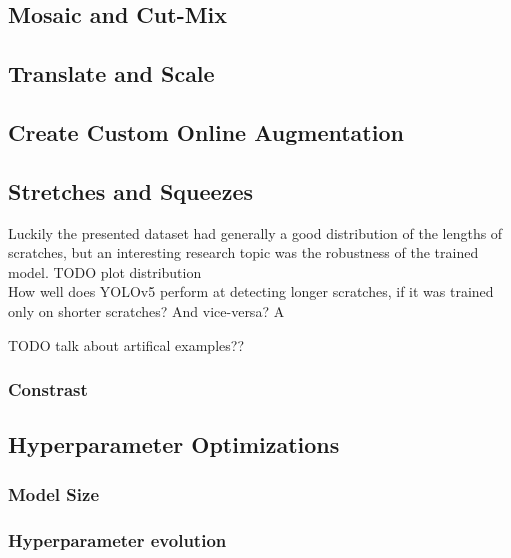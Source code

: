 \subsection{Mosaic and Cut-Mix}


\subsection{Translate and Scale}

\subsection{Create Custom Online Augmentation}

\subsection{Stretches and Squeezes}
Luckily the presented dataset had generally a good distribution of the lengths of scratches, but an interesting research topic was the robustness of the trained model.
TODO plot distribution \\

 How well does YOLOv5 perform at detecting longer scratches, if it was trained only on shorter scratches? And vice-versa? A


TODO talk about artifical examples?? \\

\subsubsection{Constrast}



\subsection{Hyperparameter Optimizations}

\subsubsection{Model Size}

\subsubsection{Hyperparameter evolution}

